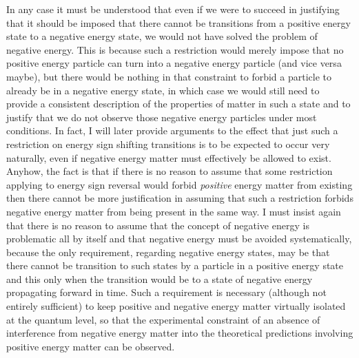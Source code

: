 \documentclass[notitlepage,12pt]{report}
\begin{document}
In any case it must be understood that even if we were to succeed in justifying that it should be imposed that there cannot be transitions from a positive energy state to a negative energy state, we would not have solved the problem of negative energy. This is because such a restriction would merely impose that no positive energy particle can turn into a negative energy particle (and vice versa maybe), but there would be nothing in that constraint to forbid a particle to already be in a negative energy state, in which case we would still need to provide a consistent description of the properties of matter in such a state and to justify that we do not observe those negative energy particles under most conditions. In fact, I will later provide arguments to the effect that just such a restriction on energy sign shifting transitions is to be expected to occur very naturally, even if negative energy matter must effectively be allowed to exist. Anyhow, the fact is that if there is no reason to assume that some restriction applying to energy sign reversal would forbid \textit{positive} energy matter from existing then there cannot be more justification in assuming that such a restriction forbids negative energy matter from being present in the same way. I must insist again that there is no reason to assume that the concept of negative energy is problematic all by itself and that negative energy must be avoided systematically, because the only requirement, regarding negative energy states, may be that there cannot be transition to such states by a particle in a positive energy state and this only when the transition would be to a state of negative energy propagating forward in time. Such a requirement is necessary (although not entirely sufficient) to keep positive and negative energy matter virtually isolated at the quantum level, so that the experimental constraint of an absence of interference from negative energy matter into the theoretical predictions involving positive energy matter can be observed.
\end{document}
